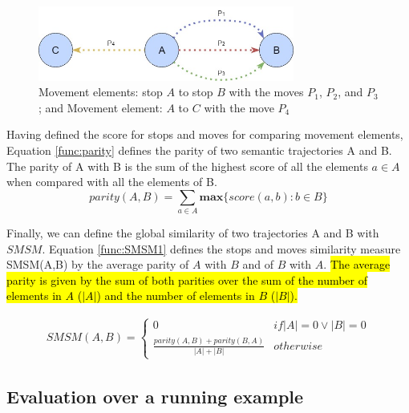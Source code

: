 \documentclass[12pt]{article}
\begin{document}
\begin{figure}[h]
\centering
\includegraphics[width=0.75\textwidth]{Images/Toy_trajectories.jpg}
\caption{\label{fig:move} Movement elements: stop $A$ to stop $B$ with the moves $P_1$, $P_2$, and $P_3$; and Movement element: $A$ to $C$ with the move $P_4$}
\end{figure}

Having defined the score for stops and moves for comparing movement elements, Equation \ref{func:parity} defines the parity of two semantic trajectories A and B. The parity of A with B is the sum of the highest score of all the elements $a \in A$ when compared with all the elements of B.
\begin{equation}
\label{func:parity}
parity(A, B) = \sum\limits_{a\in A} \textbf{max}\{\textit{score}(a, b) : b \in B\}
\end{equation}

Finally, we can define the global similarity of two trajectories A and B with $SMSM$. Equation \ref{func:SMSM1} defines the stops and moves similarity measure SMSM(A,B) by the average parity of $A$ with $B$ and of $B$ with $A$. \hl{The average parity is given by the sum of both parities over the sum of the number of elements in $A$ ($|A|$) and the number of elements in $B$ ($|B|$).}

\begin{equation}
\label{func:SMSM1}
\begin{split}
  SMSM(A, B) = 
  \begin{cases} 
      0 & if  |A| = 0 \vee |B| = 0 \\
      \frac{parity(A, B) + parity(B, A)}{|A| + |B|} & otherwise
  \end{cases}
\end{split}
\end{equation}



\subsection{Evaluation over a running example}
\end{document}
